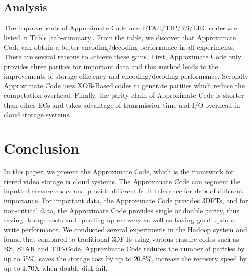 \documentclass[sigconf]{acmart}
\begin{document}
\subsection{Analysis}
The improvements of Approximate Code over STAR/TIP/RS/LRC codes are listed in Table \ref{tab-summary}. From the table, we discover that Approximate Code can obtain a better encoding/decoding performance in all experiments. There are several reasons to achieve these gains. First, Approximate Code only provides three parities for important data and this method leads to the improvements of storage efficiency and encoding/decoding performance. Secondly Approximate Code uses XOR-Based codes to generate parities which reduce the computation overhead. Finally, the parity chain of Approximate Code is shorter than other ECs and takes advantage of transmission time and I/O overhead in cloud storage systems.

\section{Conclusion}\label{Conclusion}
In this paper, we present the Approximate Code, which is the framework for tiered video storage in cloud systems. The Approximate Code can segment the inputted erasure codes and provide different fault tolerance for data of different importance. For important data, the Approximate Code provides 3DFTs, and for non-critical data, the Approximate Code provides single or double parity, thus saving storage costs and speeding up recovery as well as having good update write performance. We conducted several experiments in the Hadoop system and found that compared to traditional 3DFTs using various erasure codes such as RS, STAR and TIP-Code, Approximate Code reduces the number of parities by up to 55\%, saves the storage cost by up to 20.8\%, increase the recovery speed by up to 4.70X when double disk fail.



\end{document}
